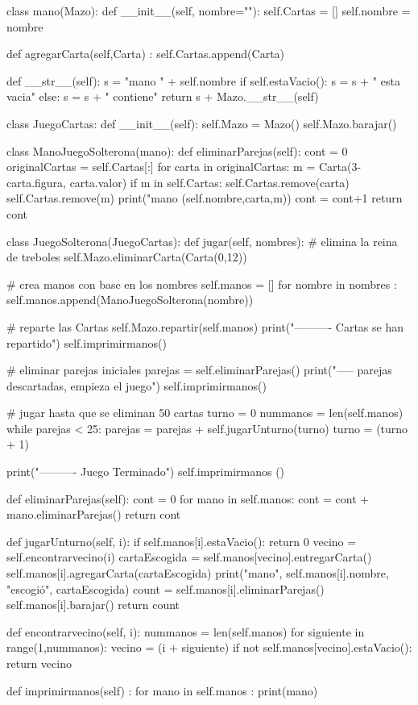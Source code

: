 \begin{pythoncode}
class mano(Mazo):
  def __init__(self, nombre=""):
    self.Cartas = []
    self.nombre = nombre

  def agregarCarta(self,Carta) :
    self.Cartas.append(Carta)

  def __str__(self):
    s = "mano " + self.nombre
    if self.estaVacio():
      s = s + " esta vacia\n"
    else:
      s = s + " contiene\n"
    return s + Mazo.__str__(self)

class JuegoCartas:
  def __init__(self):
    self.Mazo = Mazo()
    self.Mazo.barajar()

class ManoJuegoSolterona(mano):
  def eliminarParejas(self):
    cont = 0
    originalCartas = self.Cartas[:]
    for carta in originalCartas:
      m = Carta(3-carta.figura, carta.valor)
      if m in self.Cartas:
        self.Cartas.remove(carta)
        self.Cartas.remove(m)
        print("mano %
                 (self.nombre,carta,m))
        cont = cont+1
    return cont

class JuegoSolterona(JuegoCartas):
  def jugar(self, nombres):
    # elimina la reina de treboles
    self.Mazo.eliminarCarta(Carta(0,12))

    # crea manos con base en los nombres
    self.manos = []
    for nombre in nombres : 
        self.manos.append(ManoJuegoSolterona(nombre))

    # reparte las Cartas
    self.Mazo.repartir(self.manos)
    print("---------- Cartas se han repartido")
    self.imprimirmanos()

    # eliminar parejas iniciales
    parejas = self.eliminarParejas()
    print("----- parejas descartadas, empieza el juego")
    self.imprimirmanos()

    # jugar hasta que se eliminan 50 cartas
    turno = 0
    nummanos = len(self.manos)
    while parejas < 25:
      parejas = parejas + self.jugarUnturno(turno)
      turno = (turno + 1) %

    print("---------- Juego Terminado")
    self.imprimirmanos ()

  def eliminarParejas(self):
    cont = 0
    for mano in self.manos:
      cont = cont + mano.eliminarParejas()
    return cont

  def jugarUnturno(self, i):
    if self.manos[i].estaVacio():
      return 0
    vecino = self.encontrarvecino(i)
    cartaEscogida = self.manos[vecino].entregarCarta()
    self.manos[i].agregarCarta(cartaEscogida)
    print("mano", self.manos[i].nombre, 
          "escogió", cartaEscogida)
    count = self.manos[i].eliminarParejas()
    self.manos[i].barajar()
    return count

  def encontrarvecino(self, i):
    nummanos = len(self.manos)
    for siguiente in range(1,nummanos):
      vecino = (i + siguiente) %
      if not self.manos[vecino].estaVacio():
        return vecino

  def imprimirmanos(self) :
    for mano in self.manos :
      print(mano)
\end{pythoncode}

